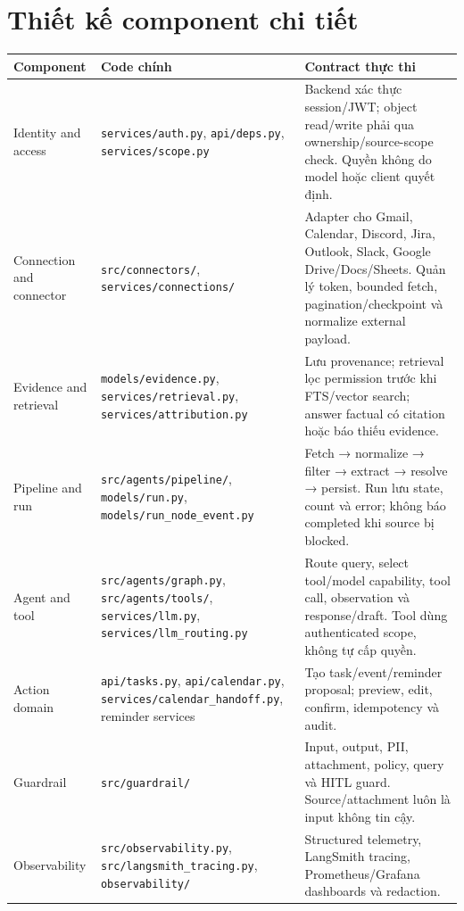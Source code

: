 \documentclass[12pt,a4paper]{article}
\begin{document}
\section{Thiết kế component chi tiết}
\begin{longtable}{p{3cm}p{4.5cm}p{6.5cm}}
\toprule Component & Code chính & Contract thực thi \\ \midrule
\endhead
Identity and access & \texttt{services/auth.py}, \texttt{api/deps.py}, \texttt{services/scope.py} & Backend xác thực session/JWT; object read/write phải qua ownership/source-scope check. Quyền không do model hoặc client quyết định. \\
Connection and connector & \texttt{src/connectors/}, \texttt{services/connections/} & Adapter cho Gmail, Calendar, Discord, Jira, Outlook, Slack, Google Drive/Docs/Sheets. Quản lý token, bounded fetch, pagination/checkpoint và normalize external payload. \\
Evidence and retrieval & \texttt{models/evidence.py}, \texttt{services/retrieval.py}, \texttt{services/attribution.py} & Lưu provenance; retrieval lọc permission trước khi FTS/vector search; answer factual có citation hoặc báo thiếu evidence. \\
Pipeline and run & \texttt{src/agents/pipeline/}, \texttt{models/run.py}, \texttt{models/run\_node\_event.py} & Fetch → normalize → filter → extract → resolve → persist. Run lưu state, count và error; không báo completed khi source bị blocked. \\
Agent and tool & \texttt{src/agents/graph.py}, \texttt{src/agents/tools/}, \texttt{services/llm.py}, \texttt{services/llm\_routing.py} & Route query, select tool/model capability, tool call, observation và response/draft. Tool dùng authenticated scope, không tự cấp quyền. \\
Action domain & \texttt{api/tasks.py}, \texttt{api/calendar.py}, \texttt{services/calendar\_handoff.py}, reminder services & Tạo task/event/reminder proposal; preview, edit, confirm, idempotency và audit. \\
Guardrail & \texttt{src/guardrail/} & Input, output, PII, attachment, policy, query và HITL guard. Source/attachment luôn là input không tin cậy. \\
Observability & \texttt{src/observability.py}, \texttt{src/langsmith_tracing.py}, \texttt{observability/} & Structured telemetry, LangSmith tracing, Prometheus/Grafana dashboards và redaction. \\
\bottomrule
\end{longtable}
\end{document}
